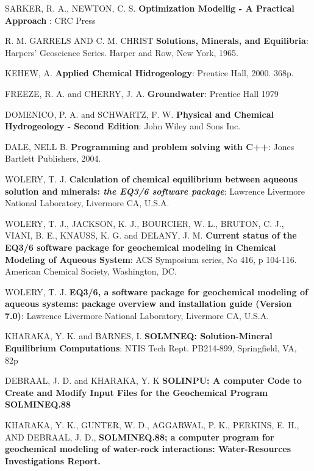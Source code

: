 \documentclass[ppgc,mestrado,english]{iiufrgs}
\begin{document}
\begin{thebibliography}{este-parametro-nao-eh-usado-pelo-estilo-ABNT}

 SARKER, R. A., NEWTON, C. S.
\textbf{Optimization Modellig - A Practical Approach} : CRC Press

 R. M. GARRELS AND C. M. CHRIST
\textbf{Solutions, Minerals, and Equilibria}: Harpers' Geoscience Series. Harper and Row, New York, 1965.

 KEHEW, A.
 \textbf{Applied Chemical Hidrogeology}: Prentice Hall, 2000. 368p.

 FREEZE, R. A. and CHERRY, J. A.
\textbf{Groundwater}: Prentice Hall 1979

 DOMENICO, P. A. and SCHWARTZ, F. W.
\textbf{Physical and Chemical Hydrogeology - Second Edition}: John Wiley and Sons Inc.

  DALE, NELL B.
 \textbf{Programming and problem solving with C++}: Jones Bartlett Publishers, 2004.
   
 WOLERY, T. J. 
\textbf{Calculation of chemical equilibrium between aqueous solution and minerals: \emph{the EQ3/6 software package}}: Lawrence Livermore National Laboratory, Livermore CA, U.S.A.

 WOLERY, T. J., JACKSON, K. J., BOURCIER, W. L., BRUTON, C. J., VIANI, B. E., KNAUSS, K. G. and DELANY, J. M.
\textbf{Current status of the EQ3/6 software package for geochemical modeling in Chemical Modeling of Aqueous System}: ACS Symposium series, No 416, p 104-116. American Chemical Society, Washington, DC.

 WOLERY, T. J.
\textbf{EQ3/6, a software package for geochemical modeling of aqueous systems: package overview and installation guide (Version 7.0)}: Lawrence Livermore National Laboratory, Livermore CA, U.S.A.

 KHARAKA, Y. K. and BARNES, I.
\textbf{SOLMNEQ: Solution-Mineral Equilibrium Computations}: NTIS Tech Rept. PB214-899, Springfield, VA, 82p

 DEBRAAL, J. D. and KHARAKA, Y. K
\textbf{SOLINPU: A computer Code to Create and Modify Input Files for the Geochemical Program SOLMINEQ.88}

 KHARAKA, Y. K., GUNTER, W. D., AGGARWAL, P. K., PERKINS, E. H., AND DEBRAAL, J. D.,
\textbf{SOLMINEQ.88; a computer program for geochemical modeling of water-rock interactions: Water-Resources Investigations Report.}


\end{thebibliography}
\end{document}
